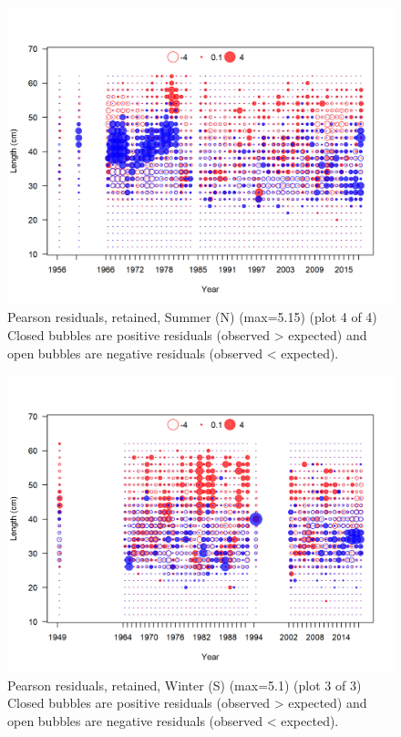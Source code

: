 \documentclass[12pt,]{article}
\begin{document}
\begin{figure}
\centering
\includegraphics{r4ss/plots_mod1/comp_lenfit_residsflt2mkt2_page4.png}
\caption{Pearson residuals, retained, Summer (N) (max=5.15) (plot 4 of
4)\\
Closed bubbles are positive residuals (observed \textgreater{} expected)
and open bubbles are negative residuals (observed \textless{} expected).
\label{fig:ws_len_pearson}}
\end{figure}

\begin{figure}
\centering
\includegraphics{r4ss/plots_mod1/comp_lenfit_residsflt3mkt2_page3.png}
\caption{Pearson residuals, retained, Winter (S) (max=5.1) (plot 3 of
3)\\
Closed bubbles are positive residuals (observed \textgreater{} expected)
and open bubbles are negative residuals (observed \textless{} expected).
\label{fig:sn_len_pearson}}
\end{figure}
\end{document}

